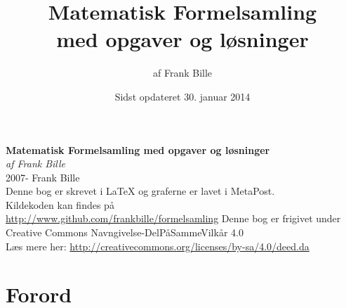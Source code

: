 \documentclass[11pt,a5paper,fleqn,leqno]{book}
\begin{document}
\setlength{\parindent}{0cm}

\frontmatter

\title{Matematisk Formelsamling\\med opgaver og løsninger}
\author{af Frank Bille}
\date{Sidst opdateret 30. januar 2014}
\maketitle

\begingroup
\footnotesize
\begin{center}
\textbf{Matematisk Formelsamling med opgaver og løsninger}\\
\textit{af Frank Bille}\\
\vspace*{2em}
\textcopyright{} 2007-\the\year{} Frank Bille\\
\vspace*{2em}
Denne bog er skrevet i \LaTeX{} og graferne er lavet i MetaPost.\\
Kildekoden kan findes på\\
\url{http://www.github.com/frankbille/formelsamling}
\vfill
Denne bog er frigivet under\\
Creative Commons Navngivelse-DelPåSammeVilkår 4.0\\
Læs mere her: \url{http://creativecommons.org/licenses/by-sa/4.0/deed.da}\\
\vspace*{2em}
\ccbysa

\end{center}
\endgroup

\tableofcontents

\chapter{Forord}
\end{document}

